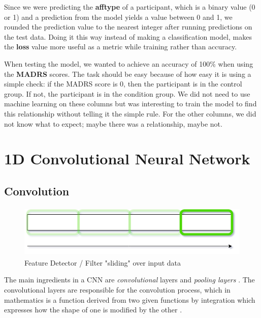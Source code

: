 Since we were predicting the \textbf{afftype} of a participant, which is a binary value (0 or 1) and a prediction from the model yields a value between 0 and 1, we rounded the prediction value to the nearest integer after running predictions on the test data. Doing it this way instead of making a classification model, makes the \textbf{loss} value more useful as a metric while training rather than accuracy. 

When testing the model, we wanted to achieve an accuracy of 100\% when using the \textbf{MADRS} scores. The task should be easy because of how easy it is using a simple check: if the MADRS score is 0, then the participant is in the control group. If not, the participant is in the condition group. We did not need to use machine learning on these columns but was interesting to train the model to find this relationship without telling it the simple rule. For the other columns, we did not know what to expect; maybe there was a relationship, maybe not.

\section{1D Convolutional Neural Network}

\subsection{Convolution}

\begin{figure}[h]
\begin{center}
    \includegraphics[height=2.5cm]{img/feature_detector.png}
    \caption{Feature Detector / Filter "sliding" over input data}
    \label{figure:feature_detector}
\end{center}
\end{figure}

\noindent The main ingredients in a CNN are \textit{convolutional} layers and \textit{pooling layers} \cite{deep_learning}. The convolutional layers are responsible for the convolution process, which in mathematics is a function derived from two given functions by integration which expresses how the shape of one is modified by the other \cite{convolution_definition}. 

